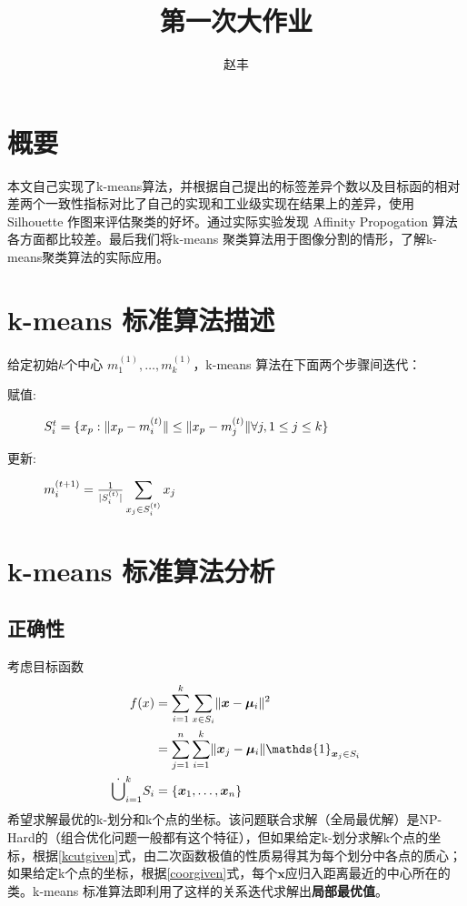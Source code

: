 \documentclass{ctexart}
\DeclarePairedDelimiter\norm{\lVert}{\rVert}
\DeclarePairedDelimiter\abs{\lvert}{\rvert}
\theoremstyle{definition}
\theoremstyle{remark}
\begin{document}
\title{第一次大作业}
\author{赵丰}
\maketitle
\section{概要}
本文自己实现了k-means算法，并根据自己提出的标签差异个数以及目标函的相对差两个一致性指标对比了自己的实现和工业级实现在结果上的差异，使用 Silhouette 作图来评估聚类的好坏。通过实际实验发现 Affinity Propogation 算法各方面都比较差。最后我们将k-means 聚类算法用于图像分割的情形，了解k-means聚类算法的实际应用。


\section{k-means 标准算法描述}
给定初始$k$个中心 $m_1^{(1)},\dots,m_k^{(1)}$，k-means 算法在下面两个步骤间迭代\cite{kmeans-wiki}：
\begin{description}
\item[赋值:] $S_i^{t}=\{x_p : \norm{x_p - m_i^{(t)}}\leq \norm{x_p - m_j^{(t)}} \forall j, 1\leq j \leq k\}$
\item[更新:] $ m_i^{(t+1)} = \frac{1}{\abs{S_i^{(t)}}} \displaystyle\sum_{x_j \in S_i^{(t)}} x_j$
\end{description}
\section{k-means 标准算法分析}
\subsection{正确性}
考虑目标函数
\begin{subequations}
\begin{align}
\label{kcutgiven}f(x) &=  \sum_{i=1}^k  \sum_{x\in S_i} \norm{\bm{x}-\bm{\mu}_i}^2\\ 
\label{coorgiven}& = \sum_{j=1}^n \sum_{i=1}^k \norm{\bm{x}_j - \bm{\mu}_{i}}\mathds{1}_{\bm{x}_j \in S_i} \\
\dot\bigcup_{i=1}^k S_i & =  \{\bm{x}_1,\dots,\bm{x}_n\}\nonumber
\end{align}
\end{subequations}
希望求解最优的k-划分和k个点的坐标。该问题联合求解（全局最优解）是NP-Hard的（组合优化问题一般都有这个特征），但如果给定k-划分求解k个点的坐标，根据\eqref{kcutgiven}式，由二次函数极值的性质易得其为每个划分中各点的质心；如果给定k个点的坐标，根据\eqref{coorgiven}式，每个$\bm{x}$应归入距离最近的中心所在的类。k-means 标准算法即利用了这样的关系迭代求解出\textbf{局部最优值}。
\end{document}
